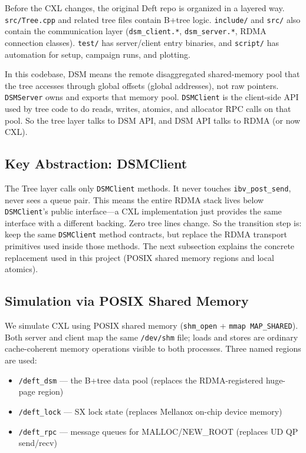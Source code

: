 \documentclass[10pt,twocolumn]{article}
\begin{document}
Before the CXL changes, the original Deft repo is organized in a layered way.
\texttt{src/Tree.cpp} and related tree files contain B+tree logic.
\texttt{include/} and \texttt{src/} also contain the communication layer
(\texttt{dsm\_client.*}, \texttt{dsm\_server.*}, RDMA connection classes).
\texttt{test/} has server/client entry binaries, and \texttt{script/} has
automation for setup, campaign runs, and plotting.

In this codebase, DSM means the remote disaggregated shared-memory pool that
the tree accesses through global offsets (global addresses), not raw pointers.
\texttt{DSMServer} owns and exports that memory pool.
\texttt{DSMClient} is the client-side API used by tree code to do reads, writes,
atomics, and allocator RPC calls on that pool.
So the tree layer talks to DSM API, and DSM API talks to RDMA (or now CXL).

\subsection{Key Abstraction: DSMClient}

The Tree layer calls only \texttt{DSMClient} methods.
It never touches \texttt{ibv\_post\_send}, never sees a queue pair.
This means the entire RDMA stack lives below \texttt{DSMClient}'s public
interface---a CXL implementation just provides the same interface with a
different backing.
Zero tree lines change.
So the transition step is: keep the same \texttt{DSMClient} method contracts,
but replace the RDMA transport primitives used inside those methods.
The next subsection explains the concrete replacement used in this project
(POSIX shared memory regions and local atomics).

\subsection{Simulation via POSIX Shared Memory}

We simulate CXL using POSIX shared memory (\texttt{shm\_open} +
\texttt{mmap MAP\_SHARED}).
Both server and client map the same \texttt{/dev/shm} file; loads and stores
are ordinary cache-coherent memory operations visible to both processes.
Three named regions are used:

\begin{itemize}[nosep]
  \item \texttt{/deft\_dsm} --- the B+tree data pool (replaces the
    RDMA-registered huge-page region)
  \item \texttt{/deft\_lock} --- SX lock state (replaces Mellanox on-chip
    device memory)
  \item \texttt{/deft\_rpc} --- message queues for MALLOC/NEW\_ROOT
    (replaces UD QP send/recv)
\end{itemize}
\end{document}
